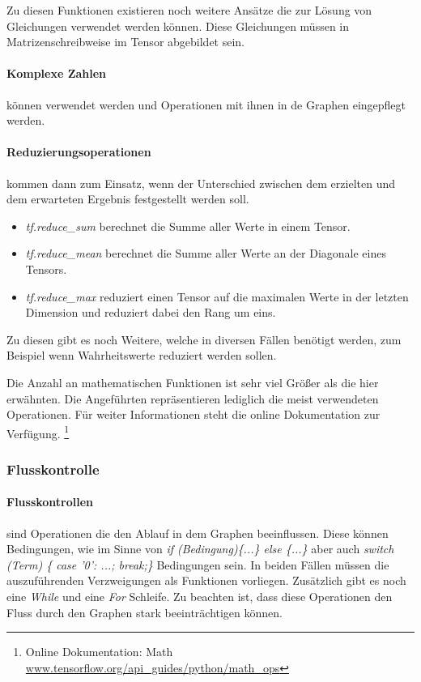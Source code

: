 \noindent
Zu diesen Funktionen existieren noch weitere Ansätze die zur Lösung von Gleichungen verwendet werden können. 
Diese Gleichungen müssen in Matrizenschreibweise im Tensor abgebildet sein. 

\paragraph{Komplexe Zahlen} können verwendet werden und Operationen mit ihnen in de Graphen eingepflegt werden. 

\paragraph{Reduzierungsoperationen} kommen dann zum Einsatz, wenn der Unterschied zwischen dem erzielten und dem erwarteten Ergebnis festgestellt werden soll. 
\begin{itemize}
	\item \textit{tf.reduce\_sum} berechnet die Summe aller Werte in einem Tensor.
	\item \textit{tf.reduce\_mean} berechnet die Summe aller Werte an der Diagonale eines Tensors. 
	\item \textit{tf.reduce\_max} reduziert einen Tensor auf die maximalen Werte in der letzten Dimension und reduziert dabei den Rang um eins.
\end{itemize}

\noindent
Zu diesen gibt es noch Weitere, welche in diversen Fällen benötigt werden, zum Beispiel wenn Wahrheitswerte reduziert werden sollen. \newline

\noindent
Die Anzahl an mathematischen Funktionen ist sehr viel Größer als die hier erwähnten. 
Die Angeführten repräsentieren lediglich die meist verwendeten Operationen. 
Für weiter Informationen steht die online Dokumentation zur Verfügung. \footnote{Online Dokumentation: Math  \url{www.tensorflow.org/api_guides/python/math_ops}}

\subsubsection{Flusskontrolle}

\paragraph{Flusskontrollen} sind Operationen die den Ablauf in dem Graphen beeinflussen. 
Diese können Bedingungen, wie im Sinne von \textit{if (Bedingung)\{...\} else \{...\}} aber auch \textit{switch (Term) \{ case '0': ...; break;\}} Bedingungen sein. 
In beiden Fällen müssen die auszuführenden Verzweigungen als Funktionen vorliegen. 
Zusätzlich gibt es noch eine \textit{While} und eine \textit{For} Schleife. 
Zu beachten ist, dass diese Operationen den Fluss durch den Graphen stark beeinträchtigen können.

